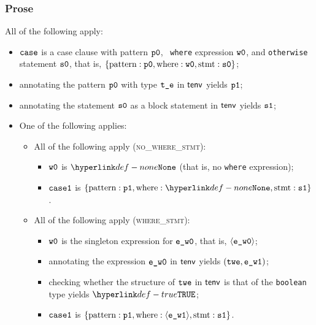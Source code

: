 \subsubsection{Prose}
All of the following apply:
\begin{itemize}
  \item $\texttt{case}$ is a case clause with pattern $\texttt{p0}$, \optional\ \texttt{where} expression $\texttt{w0}$,
        and \texttt{otherwise} statement $\texttt{s0}$, that is,
        $\{ \text{pattern}: \texttt{p0}, \text{where}: \texttt{w0}, \text{stmt}: \texttt{s0} \}$;
  \item annotating the pattern $\texttt{p0}$ with type $\texttt{t\_e}$ in $\textsf{tenv}$ yields $\texttt{p1}$\ProseOrTypeError;
  \item annotating the statement $\texttt{s0}$ as a block statement in $\textsf{tenv}$ yields $\texttt{s1}$\ProseOrTypeError;
  \item One of the following applies:
  \begin{itemize}
    \item All of the following apply (\textsc{no\_where\_stmt}):
    \begin{itemize}
      \item $\texttt{w0}$ is $\None$ (that is, no \texttt{where} expression);
      \item $\texttt{case1}$ is $\{ \CasePattern: \vpone, \CaseWhere: \None, \CaseStmt: \vsone \}$.
    \end{itemize}

    \item All of the following apply (\textsc{where\_stmt}):
    \begin{itemize}
      \item $\texttt{w0}$ is the singleton expression for $\texttt{e\_w0}$, that is, $\langle\texttt{e\_w0}\rangle$;
      \item annotating the expression $\texttt{e\_w0}$ in $\textsf{tenv}$ yields $(\texttt{twe}, \texttt{e\_w1})$\ProseOrTypeError;
      \item checking whether the structure of $\texttt{twe}$ in $\textsf{tenv}$ is that of the \texttt{boolean} type yields $\True$\ProseOrTypeError;
      \item $\texttt{case1}$ is $\{ \text{pattern}: \texttt{p1}, \text{where}: \langle\texttt{e\_w1}\rangle, \text{stmt}: \texttt{s1} \}$.
    \end{itemize}
  \end{itemize}
\end{itemize}

